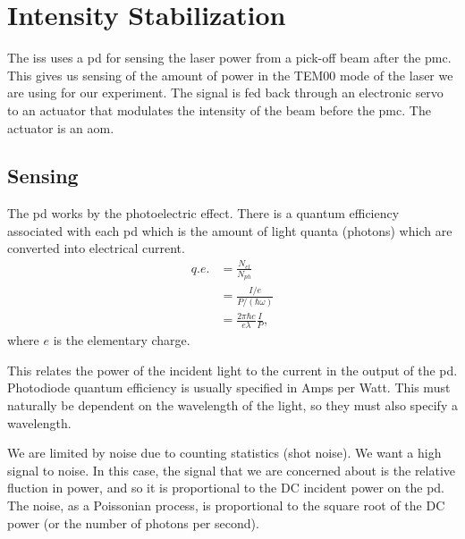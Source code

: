 \section{Intensity Stabilization}


The \ac{iss} uses a \ac{pd} for sensing the laser power from a pick-off
beam after the \ac{pmc}. This gives us sensing of the amount of power in
the TEM00 mode of the laser we are using for our experiment. The signal is
fed back through an electronic servo to an actuator that modulates the
intensity of the beam before the \ac{pmc}. The actuator is an \ac{aom}.

\subsection{Sensing}

The \ac{pd} works by the photoelectric effect. There is a quantum
efficiency associated with each \ac{pd} which is the amount of light quanta
(photons) which are converted into electrical current.
\begin{align}
q.e. &= \frac{N_{el}}{N_{ph}} \\
     &= \frac{I/e}{P/(\hbar \omega)} \\
     &= \frac{2 \pi \hbar c}{e \lambda} \frac{I}{P} ,
\end{align}
where $e$ is the elementary charge.

This relates the
power of the incident light to the current in the output of the \ac{pd}.
Photodiode quantum efficiency is usually specified in Amps per Watt.
This must naturally be dependent on the wavelength of the light, so they must
also specify a wavelength.

We are limited by noise due to counting statistics (shot noise). We want a high signal
to noise. In this case, the signal that we are concerned about is the
relative fluction in power, and so it is proportional to the DC incident
power on the \ac{pd}. The noise, as a Poissonian process, is proportional
to the square root of the DC power (or the number of photons per second).

